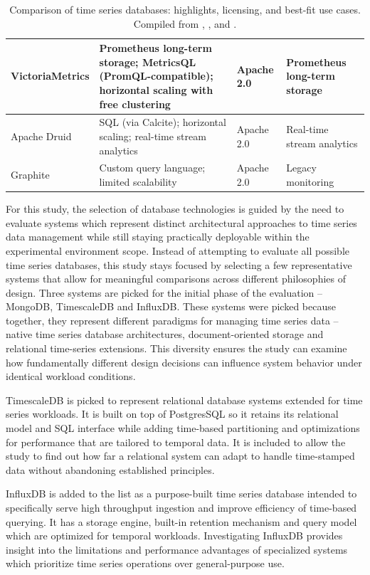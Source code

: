 \begin{table}[htbp]
\begin{tabularx}{\textwidth}{|>{\raggedright\arraybackslash}p{2.2cm}|X|>{\raggedright\arraybackslash}p{2.6cm}|X|}
\hline
VictoriaMetrics & Prometheus long-term storage; MetricsQL (PromQL-compatible); horizontal scaling with free clustering & Apache 2.0 & Prometheus long-term storage \\
\hline
Apache Druid & SQL (via Calcite); horizontal scaling; real-time stream analytics & Apache 2.0 & Real-time stream analytics \\
\hline
Graphite & Custom query language; limited scalability & Apache 2.0 & Legacy monitoring \\
\hline
\end{tabularx}
\caption{Comparison of time series databases: highlights, licensing, and best-fit use cases. Compiled from \citet{questdb2026best}, \citet{tigerdata2026best}, and \citet{mongodb2026timeseries}.}
\label{tab:tsdb-comparison}
\end{table}

For this study, the selection of database technologies is guided by the need to evaluate systems which represent distinct architectural approaches to time series data management while still staying practically deployable within the experimental environment scope. Instead of attempting to evaluate all possible time series databases, this study stays focused by selecting a few representative systems that allow for meaningful comparisons across different philosophies of design. Three systems are picked for the initial phase of the evaluation – MongoDB, TimescaleDB and InfluxDB. These systems were picked because together, they represent different paradigms for managing time series data – native time series database architectures, document-oriented storage and relational time-series extensions. This diversity ensures the study can examine how fundamentally different design decisions can influence system behavior under identical workload conditions. 

TimescaleDB \cite{timescale_timescaledb_github} is picked to represent relational database systems extended for time series workloads. It is built on top of PostgresSQL so it retains its relational model and SQL interface while adding time-based partitioning and optimizations for performance that are tailored to temporal data. It is included to allow the study to find out how far a relational system can adapt to handle time-stamped data without abandoning established principles. 

InfluxDB \cite{influxdata_influxdb} is added to the list as a purpose-built time series database intended to specifically serve high throughput ingestion and improve efficiency of time-based querying. It has a storage engine, built-in retention mechanism and query model which are optimized for temporal workloads. Investigating InfluxDB provides insight into the limitations and performance advantages of specialized systems which prioritize time series operations over general-purpose use. 


